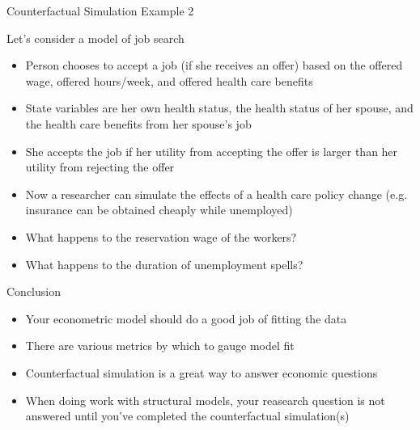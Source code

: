 \documentclass[english,xcolor=dvipsnames]{beamer}
\begin{document}
\begin{frame}{Counterfactual Simulation Example 2}

Let's consider a model of job search
\begin{itemize}
\item Person chooses to accept a job (if she receives an offer) based on
the offered wage, offered hours/week, and offered health care benefits
\item State variables are her own health status, the health status of her
spouse, and the health care benefits from her spouse's job
\item She accepts the job if her utility from accepting the offer is larger
than her utility from rejecting the offer
\item Now a researcher can simulate the effects of a health care policy
change (e.g. insurance can be obtained cheaply while unemployed)
\item What happens to the reservation wage of the workers?
\item What happens to the duration of unemployment spells?
\end{itemize}

\end{frame}


\begin{frame}{Conclusion}
\begin{itemize}
\item Your econometric model should do a good job of fitting the data
\item There are various metrics by which to gauge model fit
\item Counterfactual simulation is a great way to answer economic questions
\item When doing work with structural models, your reasearch question is
not answered until you've completed the counterfactual simulation(s)
\end{itemize}

\end{frame}
\end{document}
